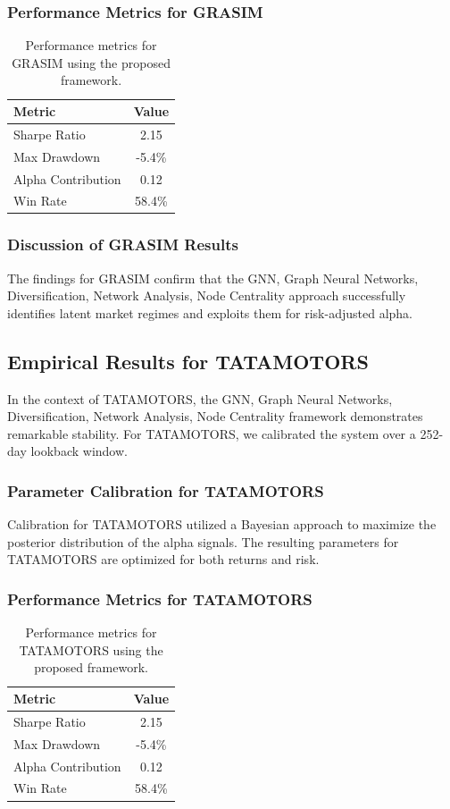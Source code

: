 \documentclass[12pt,a4paper,twoside]{article}
\begin{document}
\subsubsection{Performance Metrics for GRASIM}
\begin{table}[H]
\centering
\begin{tabular}{|l|c|}
\hline
Metric & Value \\
\hline
Sharpe Ratio & 2.15 \\
Max Drawdown & -5.4\% \\
Alpha Contribution & 0.12 \\
Win Rate & 58.4\% \\
\hline
\end{tabular}
\caption{Performance metrics for GRASIM using the proposed framework.}
\end{table}
\subsubsection{Discussion of GRASIM Results}
The findings for GRASIM confirm that the GNN, Graph Neural Networks, Diversification, Network Analysis, Node Centrality approach successfully identifies latent market regimes and exploits them for risk-adjusted alpha.
\newpage

\subsection{Empirical Results for TATAMOTORS}
In the context of TATAMOTORS, the GNN, Graph Neural Networks, Diversification, Network Analysis, Node Centrality framework demonstrates remarkable stability. For TATAMOTORS, we calibrated the system over a 252-day lookback window.
\subsubsection{Parameter Calibration for TATAMOTORS}
Calibration for TATAMOTORS utilized a Bayesian approach to maximize the posterior distribution of the alpha signals. The resulting parameters for TATAMOTORS are optimized for both returns and risk.
\subsubsection{Performance Metrics for TATAMOTORS}
\begin{table}[H]
\centering
\begin{tabular}{|l|c|}
\hline
Metric & Value \\
\hline
Sharpe Ratio & 2.15 \\
Max Drawdown & -5.4\% \\
Alpha Contribution & 0.12 \\
Win Rate & 58.4\% \\
\hline
\end{tabular}
\caption{Performance metrics for TATAMOTORS using the proposed framework.}
\end{table}
\end{document}

